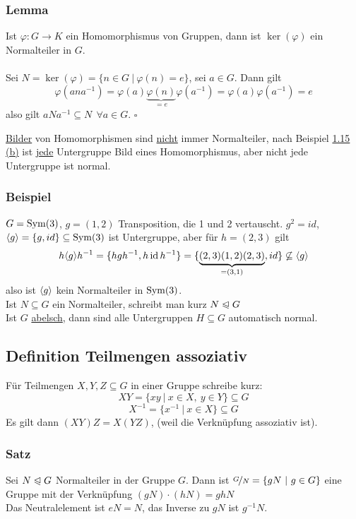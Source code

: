 \subsubsection*{Lemma}
Ist $\varphi: G \to K$ ein Homomorphismus von Gruppen, dann ist $\ker(\varphi)$ ein Normalteiler in $G$.\\

\\
Sei $N=\ker(\varphi)=\{n\in G~|~\varphi(n)=e\}$, sei $a\in G$. Dann gilt 
\[
\varphi(ana^{-1})=\varphi(a)\underbrace{\varphi(n)}_{=e}\varphi(a^{-1})=\varphi(a)\varphi(a^{-1})=e
\]
also gilt $aNa^{-1}\subseteq N~~\forall a\in G$.
\hfill $\square$

\uline{Bilder} von Homomorphismen sind \uline{nicht} immer Normalteiler, nach Beispiel \hyperref[sub:homomorphismen]{1.15 (b)} ist \uline{jede} Untergruppe Bild eines Homomorphismus, aber nicht jede Untergruppe ist normal.

\subsubsection*{Beispiel}
$G=\operatorname{Sym}(3)$, $g=(1,2)$ Transposition, die 1 und 2 vertauscht. 
$g^2=id$, $\langle g \rangle=\{g,id\}\subseteq \operatorname{Sym}(3)$ ist Untergruppe, aber für $h=(2,3)$ gilt 
\[
h\langle g \rangle h^{-1}=\{hgh^{-1}, h\operatorname{id} h^{-1} \} = \{\underbrace{(2,3)(1,2)(2,3)}_{=(3,1)}, id \} \not\subseteq \langle g \rangle
\]
also ist $\langle g \rangle$ kein Normalteiler in $\operatorname{Sym}(3)$.\\

 Ist $N\subseteq G$ ein Normalteiler, schreibt man kurz $N\trianglelefteqslant G$\\

 Ist $G$ \uline{abelsch}, dann sind alle Untergruppen $H\subseteq G$ automatisch normal.

\subsection{Definition Teilmengen assoziativ}
\label{sub:teilmengen}
Für Teilmengen $X,Y,Z \subseteq G$ in einer Gruppe schreibe kurz:\\
\[XY=\{xy~|~x\in X,~y\in Y\}\subseteq G \]
\[X^{-1}=\{x^{-1}~|~x\in X \}\subseteq G \]
Es gilt dann $(XY)Z=X(YZ)$, (weil die Verknüpfung assoziativ ist).

\subsubsection*{Satz}
Sei $N\trianglelefteqslant G$ Normalteiler in der Gruppe $G$. 
Dann ist $\nicefrac{G}{N}=\{gN~|~g\in G \}$ eine Gruppe mit der Verknüpfung $(gN)\cdot (hN)=ghN$\\
Das Neutralelement ist $eN=N$, das Inverse zu $gN$ ist $g^{-1}N$.\\

